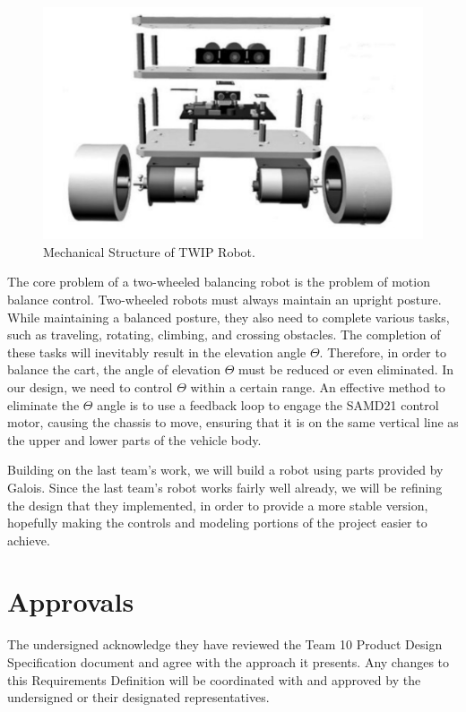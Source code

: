 \documentclass[a4paper,12pt]{article}
\begin{document}
 \begin{figure}[H]
\includegraphics[width = \textwidth]{images/PDS_Robot.png}
\caption{Mechanical Structure of TWIP Robot.\cite{zhuqin}}
	\end{figure}
\par
The core problem of a two-wheeled balancing robot is the problem of motion balance control. Two-wheeled robots must always maintain an upright posture. While maintaining a balanced posture, they also need to complete various tasks, such as traveling, rotating, climbing, and crossing obstacles. The completion of these tasks will inevitably result in the elevation angle $\Theta$. Therefore, in order to balance the cart, the angle of elevation $\Theta$ must be reduced or even eliminated. In our design, we need to control $\Theta$ within a certain range. An effective method to eliminate the $\Theta$ angle is to use a feedback loop to engage the SAMD21 control motor, causing the chassis to move, ensuring that it is on the same vertical line as the upper and lower parts of the vehicle body.\par

Building on the last team's work, we will build a robot using parts provided by Galois. Since the last team's robot works fairly well already, we will be refining the design that they implemented, in order to provide a more stable version, hopefully making the controls and modeling portions of the project easier to achieve.

\newpage
\section{Approvals}
The undersigned acknowledge they have reviewed the Team 10 Product Design Specification document and agree with the approach it presents. Any changes to this Requirements Definition will be coordinated with and approved by the undersigned or their designated representatives.
\end{document}
